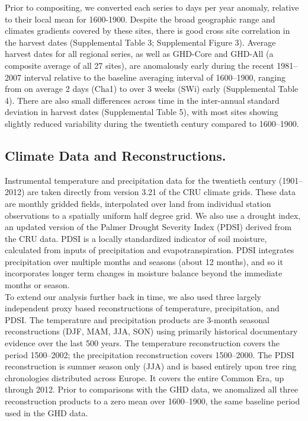 \documentclass[final]{nature}
\begin{document}
\begin{methods}
\indent Prior to compositing, we converted each series to days per year anomaly, relative to their local mean for 1600-1900. Despite the broad geographic range and climates gradients covered by these sites, there is good cross site correlation in the harvest dates (Supplemental Table 3; Supplemental Figure 3).  Average harvest dates for all regional series, as well as GHD-Core and GHD-All (a composite average of all 27 sites), are anomalously early during the recent 1981--2007 interval relative to the baseline averaging interval of 1600--1900, ranging from on average 2 days (Cha1) to over 3 weeks (SWi) early (Supplemental Table 4). There are also small differences across time in the inter-annual standard deviation in harvest dates (Supplemental Table 5), with most sites showing slightly reduced variability during the twentieth century compared to 1600--1900.

\subsection{Climate Data and Reconstructions.}
\noindent Instrumental temperature and precipitation data for the twentieth century (1901--2012) are taken directly from version 3.21 of the CRU climate grids\cite{Harris2014}. These data are monthly gridded fields, interpolated over land from individual station observations to a spatially uniform half degree grid. We also use a drought index, an updated version of the Palmer Drought Severity Index (PDSI\cite{Palmer:1965}) derived from the CRU data\cite{Schrier2013}. PDSI is a locally standardized indicator of soil moisture, calculated from inputs of precipitation and evapotranspiration. PDSI integrates precipitation over multiple months and seasons (about 12 months), and so it incorporates longer term changes in moisture balance beyond the immediate months or season.\\
\indent To extend our analysis further back in time, we also used three largely independent proxy based reconstructions of temperature\cite{Luterbacher2004}, precipitation\cite{Pauling2006}, and PDSI\cite{CookOWDA2015}. The temperature and precipitation products are 3-month seasonal reconstructions (DJF, MAM, JJA, SON) using primarily historical documentary evidence over the last 500 years. The temperature reconstruction covers the period 1500--2002; the precipitation reconstruction covers 1500--2000. The PDSI reconstruction is summer season only (JJA) and is based entirely upon tree ring chronologies distributed across Europe. It covers the entire Common Era, up through 2012. Prior to comparisons with the GHD data, we anomalized all three reconstruction products to a zero mean over 1600--1900, the same baseline period used in the GHD data.
\end{methods}
\end{document}

